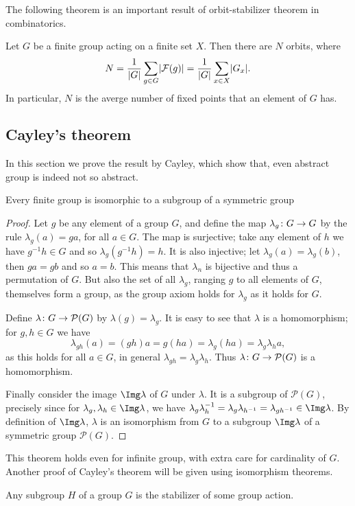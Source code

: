 \documentclass[main.tex]{subfiles}
\begin{document}
			The following theorem is an important result of orbit-stabilizer theorem in combinatorics.
			\begin{theorem} 
				Let $G$ be a finite group acting on a finite set $X$. Then there are $N$ orbits, where
				\begin{equation*}
					N = \frac{1}{\lvert G\rvert}\sum_{g\in G} \lvert\mathcal{F}(g)\rvert = \frac{1}{\lvert G\rvert}\sum_{x \in X}\lvert G_x\rvert.
				\end{equation*}
				In particular, $N$ is the averge number of fixed points that an element of $G$ has.
			\end{theorem}
			\subsection{Cayley's theorem}
				In this section we prove the result by Cayley, which show that, even abstract group is indeed not so abstract. 
				\begin{theorem} 
					Every finite group is isomorphic to a subgroup of a symmetric group
				\end{theorem}
				\begin{proof}
					Let $g$ be any element of a group $G$, and define the map $\lambda_g \colon G \rightarrow G$ by the rule $\lambda_g(a) = ga$, for all $a \in G$. The map is surjective; take any element of $h$ we have $g^{-1}h\in G$ and so $\lambda_g(g^{-1}h) = h$. It is also injective; let $\lambda_g(a) = \lambda_g(b)$, then $ga = gb$ and so $a = b$. This means that $\lambda_n$ is bijective and thus a permutation of $G$.	But also the set of all $\lambda_g$, ranging $g$ to all elements of $G$, themselves form a group, as the group axiom holds for $\lambda_g$ as it holds for $G$. 
					
					Define $\lambda \colon G \rightarrow \mathcal P(G)$ by $\lambda(g) = \lambda_g$. It is easy to see that $\lambda$ is a homomorphism; for $g, h \in G$ we have 
					\begin{equation*}
						\lambda_{gh}(a) = (gh)a = g(ha) = \lambda_{g}(ha) = \lambda_g \lambda_h a,
					\end{equation*}
					as this holds for all $a \in G$, in general $\lambda_{gh} = \lambda_g \lambda_h$. Thus $\lambda \colon G \rightarrow \mathcal{P}(G)$ is a homomorphism.
					
					Finally consider the image $\Img \lambda$ of $G$ under $\lambda$. It is a subgroup of $\mathcal{P}(G)$, precisely since for $\lambda_{g}, \lambda_h \in \Img \lambda$, we have $\lambda_g \lambda^{-1}_h = \lambda_g\lambda_{h^{-1}} = \lambda_{gh^{-1}} \in \Img \lambda$. By definition of $\Img \lambda$, $\lambda$ is an isomorphism from $G$ to a subgroup $\Img \lambda$ of a symmetric group $\mathcal{P}(G)$. 
				\end{proof}
				This theorem holds even for infinite group, with extra care for cardinality of $G$. Another proof of Cayley's theorem will be given using isomorphism theorems.
				\begin{theorem}
					Any subgroup $H$ of a group $G$ is the stabilizer of some group action. 
				\end{theorem}
\end{document}
